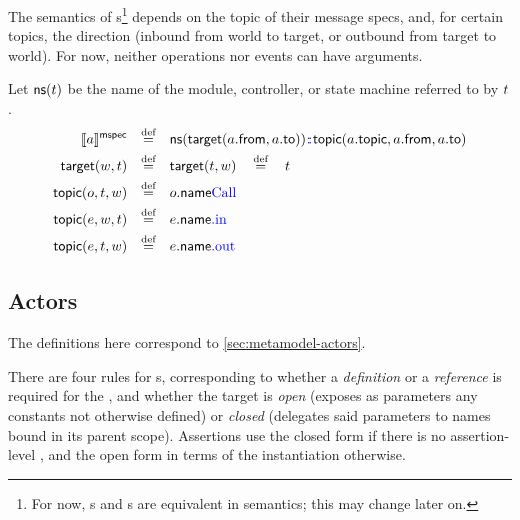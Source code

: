 \begin{defn}[\mmessagespec]

The semantics of \mmessagespec s\footnote{For now, \mgapmessagespec s and
\marrowmessagespec s are equivalent in semantics; this may change later on.}
depends on the topic of their message specs,
and, for certain topics, the direction (inbound from world to target, or
outbound from target to world).  For now, neither operations nor events can have
arguments.

\newcommand{\nsOf}[1]{\mathsf{ns}(#1)}
\newcommand{\targetOf}[2]{\mathsf{target}(#1,#2)}
\newcommand{\topicOf}[3]{\mathsf{topic}(#1,#2,#3)}

Let \(\nsOf{\atarget}\) be the name of the module, controller, or state machine
referred to by \(t\).
%
\begin{align*}
	\mspecsema{\anarrow}
\quad\defeq\quad&
	\nsOf{\targetOf{\field{\anarrow}{from}}{\field{\anarrow}{to}}}
	\tlang{{}\cspnsop{}}
	\topicOf{\field{\anarrow}{topic}}{\field{\anarrow}{from}}{\field{\anarrow}{to}}
\\
	\targetOf{\aworld}{\atarget}
\quad\defeq\quad&
	\targetOf{\atarget}{\aworld}
	\quad\defeq\quad
	\atarget
\\
	\topicOf{\anop}{\atarget}{\aworld}
\quad\defeq\quad&
	\field{\anop}{name}\tlang{\text{Call}}
\\
	\topicOf{\anevent}{\aworld}{\atarget}
\quad\defeq\quad&
	\field{\anevent}{name}\tlang{.\text{in}}
\\
	\topicOf{\anevent}{\atarget}{\aworld}
\quad\defeq\quad&
	\field{\anevent}{name}\tlang{.\text{out}}
\end{align*}

\end{defn}

\subsection{Actors}\label{ssec:semantics-tockcsp-actors}

The definitions here correspond to \cref{sec:metamodel-actors}.


There are four rules for \mtarget{}s, corresponding to whether a
\emph{definition} or a \emph{reference} is required for the
\mtarget, and whether the target is \emph{open}
(exposes as parameters any constants not otherwise defined) or
\emph{closed} (delegates said parameters to names bound
in its parent scope).  Assertions use the closed form if there is no
assertion-level \mtargetinstantiation, and the open form in terms of the
instantiation otherwise.

